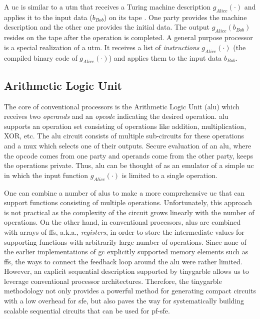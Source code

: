 A \acrshort{uc} is similar to a \acrfull{utm} \cite{turing1936computable,herken1995universal} that receives a Turing machine description $g_{Alice}(\cdot)$ and applies it to the input data ($b_{Bob}$) on its tape \cite{davis2001engines}.
One party provides the machine description and the other one provides the initial data.
The output $g_{Alice}(b_{Bob})$ resides on the tape after the operation is completed.
A general purpose processor is a special realization of a \acrshort{utm}.
It receives a list of \emph{instructions} $g_{Alice}(\cdot)$ (the compiled binary code of $g_{Alice}(\cdot)$) and applies them to the input data $b_{Bob}$.

\subsection{Arithmetic Logic Unit}\label{ssec:processor-alu}
The core of conventional processors is the Arithmetic Logic Unit (\acrshort{alu}) which receives two \emph{operands} and an \emph{opcode} indicating the desired operation.
\acrshort{alu} supports an operation set consisting of operations like addition, multiplication, XOR, etc.
The \acrshort{alu} circuit consists of multiple sub-circuits for these operations and a \acrshort{mux} which selects one of their outputs.
Secure evaluation of an \acrshort{alu}, where the opcode comes from one party and operands come from the other party, keeps the operations private.
Thus, \acrshort{alu} can be thought of as an emulator of a simple \acrshort{uc} in which the input function $g_{Alice}(\cdot)$ is limited to a single operation.

One can combine a number of \acrshort{alu}s to make a more comprehensive \acrshort{uc} that can support functions consisting of multiple operations.
Unfortunately, this approach is not practical as the complexity of the circuit grows linearly with the number of operations.
On the other hand, in conventional processors, \acrshort{alu}s are combined with arrays of \acrshort{ff}s, a.k.a., \emph{registers}, in order to store the intermediate values for supporting functions with arbitrarily large number of operations.
Since none of the earlier implementations of \acrshort{gc} explicitly supported memory elements such as \acrshort{ff}s, the ways to connect the feedback loop around the \acrshort{alu} were rather limited.
However, an explicit sequential description supported by \gls{tinygarble} allows us to leverage conventional processor architectures.
Therefore, the \gls{tinygarble} methodology not only provides a powerful method for generating compact circuits with a low overhead for \acrshort{sfe}, but also paves the way for systematically building scalable sequential circuits that can be used for \acrshort{pf-sfe}.

